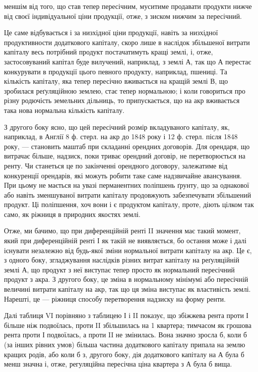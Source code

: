 \parcont{}  %
меншім від того, що став тепер пересічним, муситиме продавати продукти
нижче від своєї індивідуальної ціни продукції, отже, з зиском нижчим за
пересічний.

Це саме відбувається і за низхідної ціни продукції, навіть за низхідної продуктивности
додаткового капіталу, скоро лише в наслідок збільшеної витрати капіталу
весь потрібний продукт постачатимуть кращі землі, і, отже, застосовуваний капітал
буде вилучений, наприклад, з землі А, так що А перестає конкурувати в продукції
цього певного продукту, наприклад, пшениці. Та кількість капіталу, яка
тепер пересічно вживається на кращій землі В, що зробилася реґуляційною
землею, стає тепер нормальною; і коли говориться про різну родючість земельних
дільниць, то припускається, що на акр вживається така нова нормальна
кількість капіталу.

З другого боку ясно, що цей пересічний розмір вкладуваного капіталу, як,
наприклад, в Англії 8 ф. стерл. на акр до 1848 року і 12 ф. стерл. після 1848 року, —
становить маштаб при складанні орендних договорів. Для орендаря, що витрачає
більше, надзиск, поки триває орендний договір, не перетворюється на ренту. Чи
станеться це по закінченні орендного договору, залежатиме від конкуренції орендарів,
які можуть робити таке саме надзвичайне авансування. При цьому не мається
на увазі перманентних поліпшень ґрунту, що за однакової або навіть зменшуваної
витрати капіталу продовжують забезпечувати збільшений продукт. Ці поліпшення,
хоч вони і є продуктом капіталу, проте, діють цілком так само, як
ріжниця в природних якостях землі.

Отже, ми бачимо, що при диференційній ренті II значення має такий момент,
який при диференційній ренті І як такій не виявляється, бо остання може
і далі існувати незалежно від будь-якої зміни нормальної витрати капіталу
на акр. Це є, з одного боку, згладжування наслідків різних витрат капіталу
на реґуляційній землі А, що продукт з неї виступає тепер просто як нормальний
пересічний продукт з акра. З другого боку, це зміна в нормальному мінімумі
або пересічній величині витрати капіталу на акр, так що ця зміна виступає як
властивість землі. Нарешті, це — ріжниця способу перетворення надзиску на форму
ренти.

Далі таблиця VI порівняно з таблицею І і II показує, що збіжжева рента
проти І більше ніж подвоїлась, проти II збільшилась на 1   квартера; тимчасом
як грошова рента проти І подвоїлась, а проти II не змінилась. Вона значно
зросла б, коли б (за інших рівних умов) більша частина додаткового капіталу
припала на землю кращих родів, або коли б з, другого боку, дія додаткового
капіталу на А була б менш значна і, отже, регуляційна пересічна ціна квартера
з А була б вища.

